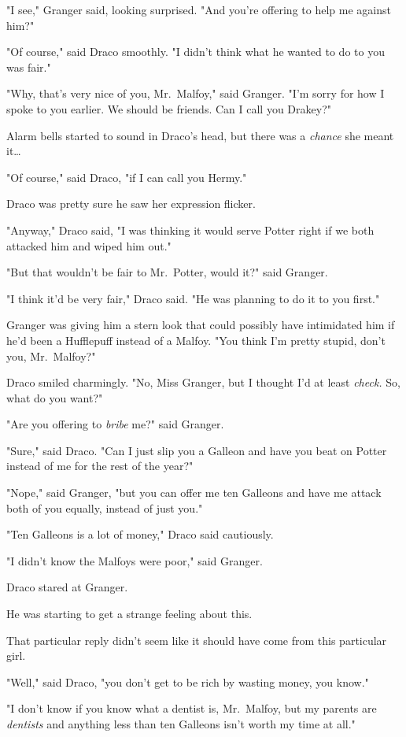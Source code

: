"I see," Granger said, looking surprised. "And you're offering to help me 
against him?"

"Of course," said Draco smoothly. "I didn't think what he wanted to do to you 
was fair."

"Why, that's very nice of you, Mr.~Malfoy," said Granger. "I'm sorry for how I 
spoke to you earlier. We should be friends. Can I call you Drakey?"

Alarm bells started to sound in Draco's head, but there was a \emph{chance} she 
meant it{\ldots}

"Of course," said Draco, "if I can call you Hermy."

Draco was pretty sure he saw her expression flicker.

"Anyway," Draco said, "I was thinking it would serve Potter right if we both 
attacked him and wiped him out."

"But that wouldn't be fair to Mr.~Potter, would it?" said Granger.

"I think it'd be very fair," Draco said. "He was planning to do it to you 
first."

Granger was giving him a stern look that could possibly have intimidated him if 
he'd been a Hufflepuff instead of a Malfoy. "You think I'm pretty stupid, don't 
you, Mr.~Malfoy?"

Draco smiled charmingly. "No, Miss Granger, but I thought I'd at least 
\emph{check.} So, what do you want?"

"Are you offering to \emph{bribe} me?" said Granger.

"Sure," said Draco. "Can I just slip you a Galleon and have you beat on Potter 
instead of me for the rest of the year?"

"Nope," said Granger, "but you can offer me ten Galleons and have me attack 
both of you equally, instead of just you."

"Ten Galleons is a lot of money," Draco said cautiously.

"I didn't know the Malfoys were poor," said Granger.

Draco stared at Granger.

He was starting to get a strange feeling about this.

That particular reply didn't seem like it should have come from this particular 
girl.

"Well," said Draco, "you don't get to be rich by wasting money, you know."

"I don't know if you know what a dentist is, Mr.~Malfoy, but my parents are 
\emph{dentists} and anything less than ten Galleons isn't worth my time at all."

